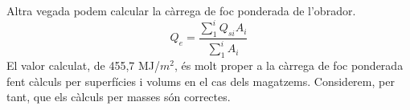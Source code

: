\noindent Altra vegada podem calcular la càrrega de foc ponderada de l'obrador.
\begin{equation}
Q_e = \frac{\sum_{1}^{i}Q_{si}A_i}{\sum_{1}^{i}A_{i}}
\end{equation}
\noindent El valor calculat, de 455,7 MJ/$m^2$, és molt proper a la càrrega de foc ponderada fent càlculs per superfícies i volums en el cas dels magatzems. Considerem, per tant, que els càlculs per masses són correctes.

